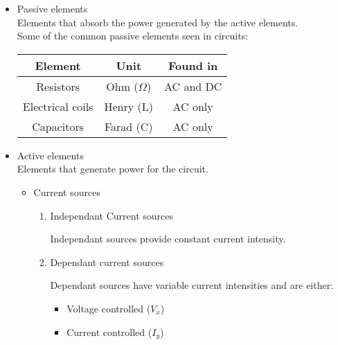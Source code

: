 \documentclass[a4paper]{book}
\begin{document}
\begin{itemize}


  \item Passive elements \\
    Elements that absorb the power generated by the active elements.\\
    Some of the common passive elements seen in circuits:

    \begin{center}
      \begin{tabular}{| c | c | c |}

        \hline
        Element & Unit & Found in \\ \hline \hline
        Resistors & Ohm ($\Omega$) & AC and DC \\ \hline
        Electrical coils & Henry (L) & AC only \\ \hline
        Capacitors & Farad (C) & AC only\\
        \hline

      \end{tabular}
    \end{center}

  \item Active elements \\ Elements that generate power for the circuit.

    \begin{itemize}

      \item Current sources

        \begin{enumerate}

          \item Independant Current sources

            Independant sources provide constant current intensity.

          \item Dependant current sources

            Dependant sources have variable current intensities and are either:

            \begin{itemize}

              \item Voltage controlled ($V_x$)

              \item Current controlled ($I_y$)

            \end{itemize}

        \end{enumerate}

    \end{itemize}

\end{itemize}
\end{document}

